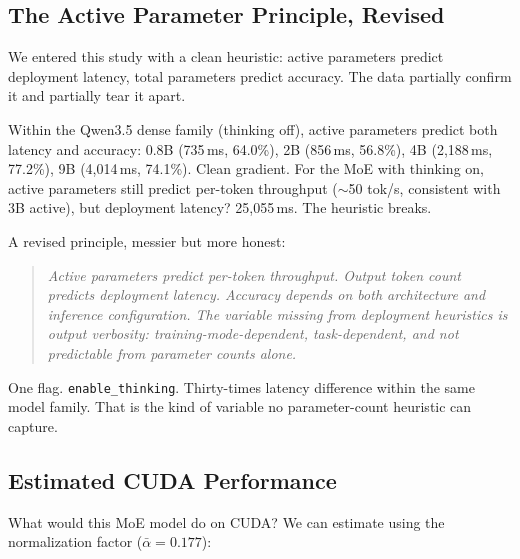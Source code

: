 \documentclass[11pt]{article}
\begin{document}
\subsection{The Active Parameter Principle, Revised}

We entered this study with a clean heuristic: active parameters predict deployment latency, total parameters predict accuracy.  The data partially confirm it and partially tear it apart.

Within the Qwen3.5 dense family (thinking off), active parameters predict both latency and accuracy: 0.8B (735\,ms, 64.0\%), 2B (856\,ms, 56.8\%), 4B (2,188\,ms, 77.2\%), 9B (4,014\,ms, 74.1\%).  Clean gradient.  For the MoE with thinking on, active parameters still predict per-token throughput (${\sim}$50 tok/s, consistent with 3B active), but deployment latency? 25,055\,ms.  The heuristic breaks.

A revised principle, messier but more honest:

\begin{quote}
\textit{Active parameters predict per-token throughput.  Output token count predicts deployment latency.  Accuracy depends on both architecture and inference configuration.  The variable missing from deployment heuristics is output verbosity: training-mode-dependent, task-dependent, and not predictable from parameter counts alone.}
\end{quote}

One flag.  \texttt{enable\_thinking}.  Thirty-times latency difference within the same model family.  That is the kind of variable no parameter-count heuristic can capture.

\subsection{Estimated CUDA Performance}

What would this MoE model do on CUDA?  We can estimate using the normalization factor ($\bar{\alpha} = 0.177$):
\end{document}
